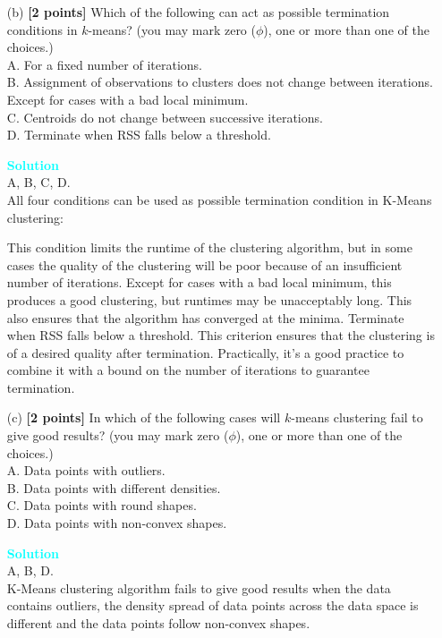 \documentclass[10pt]{article}
\newenvironment{solution}
    { \begin{mdframed}[backgroundcolor=gray!10] \textcolor{cyan}{\textbf{Solution}} \\}
    {  \end{mdframed}}
\begin{document}
\begin{enumerate}
\begin{itemize}
		      \item[(b)] \textbf{[2 points]}
		            Which of the following can act as possible termination conditions in $k$-means?
		            (you may mark zero ($\phi$), one or more than one of the choices.)\\
		            A. For a fixed number of iterations.\\
		            B. Assignment of observations to clusters does not change between iterations. Except for cases with a bad local minimum.\\
		            C. Centroids do not change between successive iterations.\\
		            D. Terminate when RSS falls below a threshold.
		            \begin{solution}
			            A, B, C, D.\\
			            All four conditions can be used as possible termination condition in K-Means clustering:

			            This condition limits the runtime of the clustering algorithm, but in some cases the quality of the clustering will be poor because of an insufficient number of iterations.
			            Except for cases with a bad local minimum, this produces a good clustering, but runtimes may be unacceptably long.
			            This also ensures that the algorithm has converged at the minima.
			            Terminate when RSS falls below a threshold. This criterion ensures that the clustering is of a desired quality after termination. Practically, it’s a good practice to combine it with a bound on the number of iterations to guarantee termination.
		            \end{solution}


		      \item[(c)] \textbf{[2 points]}
		            In which of the following cases will $k$-means clustering fail to give good results?
		            (you may mark zero ($\phi$), one or more than one of the choices.)\\
		            A. Data points with outliers.\\
		            B. Data points with different densities.\\
		            C. Data points with round shapes.\\
		            D. Data points with non-convex shapes.
		            \begin{solution}
			            A, B, D.\\
			            K-Means clustering algorithm fails to give good results when the data contains outliers, the density spread of data points across the data space is different and the data points follow non-convex shapes.
		            \end{solution}


\end{itemize}
\end{enumerate}
\end{document}
